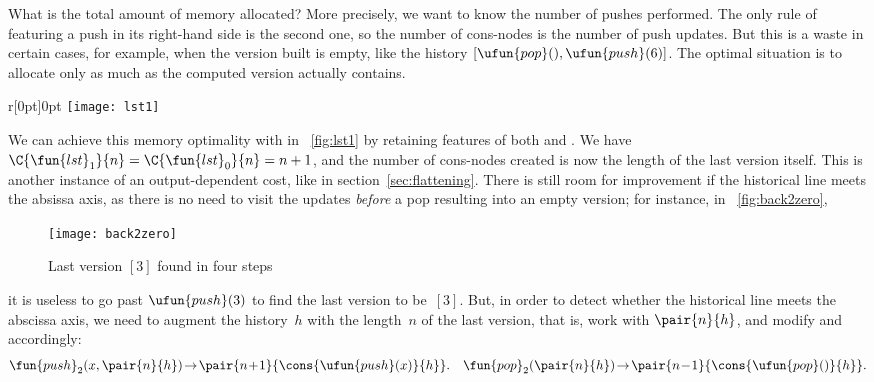 What is the total amount of memory
allocated? More precisely,
we want to know the number of pushes performed. The only rule of
 featuring a push in its right\hyp{}hand side is the
second one, so the number of cons\hyp{}nodes is the number of push
updates. But this is a waste in certain cases, for example, when the
version built is empty, like the history
\([\ufun{pop}(),\ufun{push}(6)]\). The optimal situation is to
allocate only as much as the computed version actually contains.

%
\setlength{\intextsep}{0pt}
\begin{wrapfigure}[]{r}[0pt]{0pt}
\centering
\texttt{[image: lst1]}
\caption{Last version}
\label{fig:lst1}
\end{wrapfigure}
\hspace*{-5.6pt} We can achieve this memory optimality with
 in \fig~\ref{fig:lst1} by retaining features of both
 and .
We have \(\C{\fun{lst}_1}{n} =
\C{\fun{lst}_0}{n} = n + 1\), and the number of
cons\hyp{}nodes created is now the length of the last
version itself. This is another instance of an output\hyp{}dependent
cost, like
 in
section~\vref{sec:flattening}. There is still room for improvement if
the historical line meets the absissa axis, as there is no need to
visit the updates \emph{before} a pop resulting into an empty version;
for instance, in \fig~\vref{fig:back2zero},
\begin{figure}[b]
\centering
\texttt{[image: back2zero]}
\caption{Last version $[3]$ found in four steps}
\label{fig:back2zero}
\end{figure}
it is useless to go past \(\ufun{push}(3)\)
to find the last version to be~\([3]\). But, in order to detect
whether the historical line meets the abscissa axis, we need to
augment the history~\(h\) with the length~\(n\) of the last version,
that is, work with \(\pair{n}{h}\), and modify
and~ accordingly:
\begin{equation*}
\fun{push}_2(x,\pair{n}{h}) \! \rightarrow \!
\pair{n\!+\!1}{\cons{\ufun{push}(x)}{h}}.\quad
\fun{pop}_2(\pair{n}{h}) \! \rightarrow \!
\pair{n\!-\!1}{\cons{\ufun{pop}()}{h}}.
\end{equation*}
